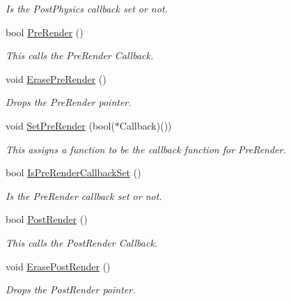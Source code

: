 \begin{DoxyCompactItemize}
\begin{DoxyCompactList}\small\item\em Is the PostPhysics callback set or not. \item\end{DoxyCompactList}\item 
bool \hyperlink{classphys_1_1CallBackManager_a244c88b8a06f68a4f4bcff6253bf6806}{PreRender} ()
\begin{DoxyCompactList}\small\item\em This calls the PreRender Callback. \item\end{DoxyCompactList}\item 
void \hyperlink{classphys_1_1CallBackManager_adadf16f3f38398c9593646416ef18499}{ErasePreRender} ()
\begin{DoxyCompactList}\small\item\em Drops the PreRender pointer. \item\end{DoxyCompactList}\item 
void \hyperlink{classphys_1_1CallBackManager_a1e060fd479413457a798ea3c6b2bcb4d}{SetPreRender} (bool($\ast$Callback)())
\begin{DoxyCompactList}\small\item\em This assigns a function to be the callback function for PreRender. \item\end{DoxyCompactList}\item 
bool \hyperlink{classphys_1_1CallBackManager_aa4eff76517403726c846911f6b97b2c2}{IsPreRenderCallbackSet} ()
\begin{DoxyCompactList}\small\item\em Is the PreRender callback set or not. \item\end{DoxyCompactList}\item 
bool \hyperlink{classphys_1_1CallBackManager_aa1a1132e877d989ecea08a16ee4b3ac1}{PostRender} ()
\begin{DoxyCompactList}\small\item\em This calls the PostRender Callback. \item\end{DoxyCompactList}\item 
void \hyperlink{classphys_1_1CallBackManager_a0eef22a8df4dc87289a18f0e6a1d0baf}{ErasePostRender} ()
\begin{DoxyCompactList}\small\item\em Drops the PostRender pointer. \item\end{DoxyCompactList}\item 

\end{DoxyCompactItemize}
